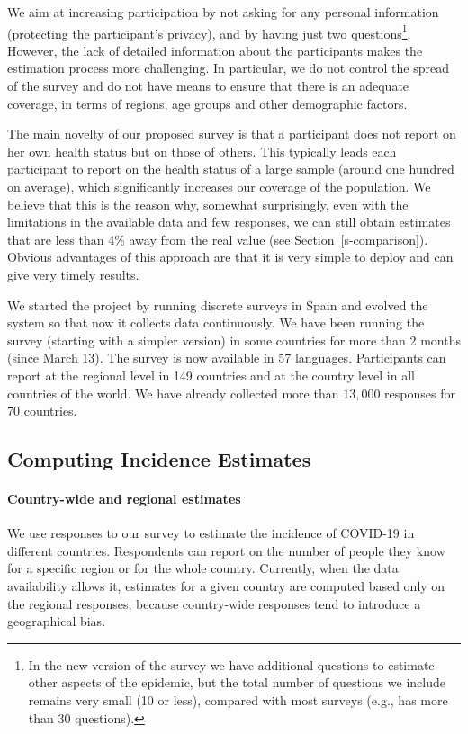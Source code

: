 \documentclass[sigconf,authordraft]{acmart}
\begin{document}
We aim at increasing participation by not asking for any personal information (protecting the participant's privacy), and by having just two questions\footnote{In the new version of the survey we have additional questions to estimate other aspects of the epidemic, but the total number of questions we include remains very small (10 or less), compared with most surveys (e.g., \cite{FB-survey} has more than 30 questions).}. However, the lack of detailed information about the participants makes the estimation process more challenging. In particular, we do not control the spread of the survey and do not have means to ensure that there is an adequate coverage, in terms of regions, age groups and other demographic factors. 

The main novelty of our proposed survey is that a participant does not report on her own health status but on those of others. This typically leads each participant to report on the health status of a large sample (around one hundred on average), which significantly increases our coverage of the population. We believe that this is the reason why, 
somewhat surprisingly, even with the limitations in the available data and few responses, we can still obtain estimates that are less than 4\% away from the real value (see Section~\ref{s-comparison}). Obvious advantages of this approach are that it is very simple to deploy and can give very timely results.

We started the project by running discrete surveys in Spain and evolved the system so that now it collects data continuously. 
We have been running the survey (starting with a simpler version) in some countries for more than 2 months (since March 13). The survey is now available in 57 languages. Participants can report at the regional level in 149 countries and at the country level in all countries of the world. We have already collected more than $13,000$ responses for 70 countries.

\subsection{Computing Incidence Estimates}

\paragraph{Country-wide and regional estimates} 
We use responses to our survey to estimate the incidence of COVID-19 in different countries. Respondents can report on the number of people they know for a specific region or for the whole country. 
Currently, when the data availability allows it,  estimates for a given country are computed based only on the regional responses, because country-wide responses tend to introduce a geographical bias. 
\end{document}
